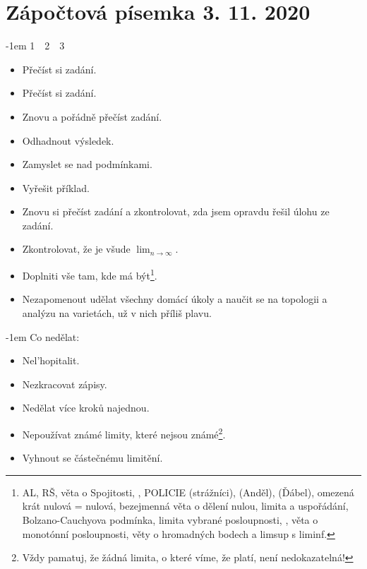 \documentclass[12pt]{article}					%
\newcommand{\its}{\item[$\square\ \square\ \square$]}
\begin{document}
\section*{\hfill Zápočtová písemka 3. 11. 2020 \hfill\ }

\noindent\kern -1em\kern 1.4pt 1\ \ 2\ \ 3\\[-2.2em]
\begin{itemize}
    \its Přečíst si zadání.
    \its Přečíst si zadání.
    \its Znovu a pořádně přečíst zadání.
    \its Odhadnout výsledek.
    \its Zamyslet se nad podmínkami.
    \its Vyřešit příklad.
    \its Znovu si přečíst zadání a zkontrolovat, zda jsem opravdu řešil úlohu ze zadání.
    \its Zkontrolovat, že je všude $\lim_{n \rightarrow ∞}$.
    \its Doplniti vše tam, kde má být\footnote{AL, RŠ, věta o Spojitosti, , POLICIE (strážníci), (Anděl), (Ďábel), omezená krát nulová = nulová, bezejmenná věta o dělení nulou, limita a uspořádání, Bolzano-Cauchyova podmínka, limita vybrané posloupnosti, , věta o monotónní posloupnosti, věty o hromadných bodech a limsup s liminf.}.
    \its Nezapomenout udělat všechny domácí úkoly a naučit se na topologii a analýzu na varietách, už v nich příliš plavu.


\end{itemize}

\noindent\kern -1em Co nedělat:\\[-2.2em]

\begin{itemize}
    \item Nel'hopitalit.
    \item Nezkracovat zápisy.
    \item Nedělat více kroků najednou.
    \item Nepoužívat známé limity, které nejsou známé\footnote{Vždy pamatuj, že žádná limita, o které víme, že platí, není nedokazatelná!}.
    \item Vyhnout se částečnému limitění.
\end{itemize}
\end{document}

